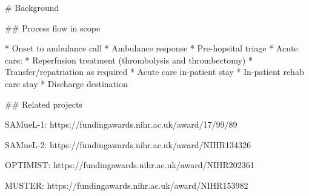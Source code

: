 \begin{markdown}
# Background

## Process flow in scope

* Onset to ambulance call
* Ambulance response
* Pre-hopsital triage
* Acute care:
    * Reperfusion treatment (thrombolysis and thrombectomy)
    * Transfer/repatriation as required
    * Acute care in-patient stay
* In-patient rehab care stay
* Discharge destination


## Related projects

SAMueL-1:
https://fundingawards.nihr.ac.uk/award/17/99/89

SAMueL-2:
https://fundingawards.nihr.ac.uk/award/NIHR134326

OPTIMIST:
https://fundingawards.nihr.ac.uk/award/NIHR202361

MUSTER:
https://fundingawards.nihr.ac.uk/award/NIHR153982    
\end{markdown}
